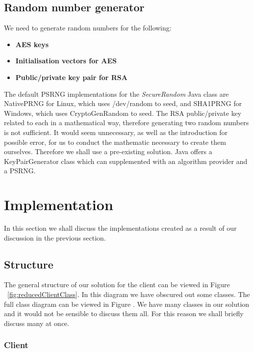\documentclass[12pt, titlepage]{article}
\begin{document}
\subsection{Random number generator}
We need to generate random numbers for the following:
\begin{itemize}
	\item \textbf{AES keys}
	\item \textbf{Initialisation vectors for AES}
	\item \textbf{Public/private key pair for RSA}
\end{itemize}
The default PSRNG implementations for the \textit{SecureRandom} Java class are NativePRNG for Linux, which uses /dev/random to seed, and SHA1PRNG for Windows, which uses CryptoGenRandom to seed.
\newline \indent The RSA public/private key related to each in a mathematical way, therefore generating two random numbers is not sufficient. It would seem unnecessary, as well as the introduction for possible error, for us to conduct the mathematic necessary to create them ourselves. Therefore we shall use a pre-existing solution. Java offers a KeyPairGenerator class which can supplemented with an algorithm provider and a PSRNG.

\section{Implementation}
In this section we shall discuss the implementations created as a result of our discussion in the previous section.
\subsection{Structure}
The general structure of our solution for the client can be viewed in Figure ~\ref{fig:reducedClientClass}. In this diagram we have obscured out some classes. The full class diagram can be viewed in Figure .
\newline \indent We have many classes in our solution and it would not be sensible to discuss them all. For this reason we shall briefly discuss many at once.

\subsubsection{Client}
\end{document}
